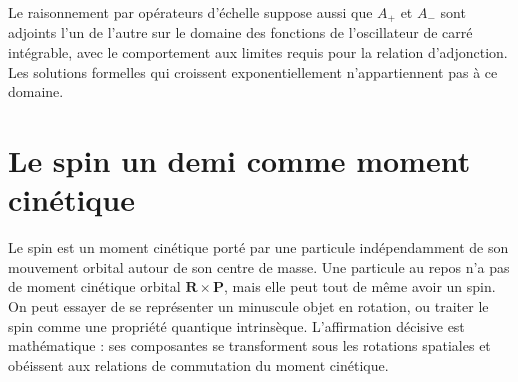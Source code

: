 \begin{classroomqa}
\end{classroomqa}

Le raisonnement par opérateurs d’échelle suppose aussi que \(A_{+}\) et \(A_{-}\) sont adjoints l’un de l’autre sur le domaine des fonctions de l’oscillateur de carré intégrable, avec le comportement aux limites requis pour la relation d’adjonction. Les solutions formelles qui croissent exponentiellement n’appartiennent pas à ce domaine.

\begin{classroomqa}
\end{classroomqa}

\section{Le spin un demi comme moment cinétique}

Le spin est un moment cinétique porté par une particule indépendamment de son mouvement orbital autour de son centre de masse. Une particule au repos n’a pas de moment cinétique orbital \(\mathbf R\times\mathbf P\), mais elle peut tout de même avoir un spin. On peut essayer de se représenter un minuscule objet en rotation, ou traiter le spin comme une propriété quantique intrinsèque. L’affirmation décisive est mathématique : ses composantes se transforment sous les rotations spatiales et obéissent aux relations de commutation du moment cinétique.

